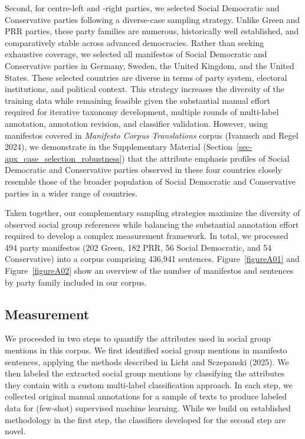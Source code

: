 \documentclass[12pt]{article}
\begin{document}
Second, for centre-left and -right parties, we selected Social Democratic and Conservative parties following a diverse-case sampling strategy.
Unlike Green and PRR parties, these party families are numerous, historically well established, and comparatively stable across advanced democracies.
Rather than seeking exhaustive coverage, we selected all manifestos of Social Democratic and Conservative parties in Germany, Sweden, the United Kingdom, and the United States.
These selected countries are diverse in terms of party system, electoral institutions, and political context.
This strategy increases the diversity of the training data while remaining feasible given the substantial manual effort required for iterative taxonomy development, multiple rounds of multi-label annotation, annotation revision, and classifier validation.
However, using manifestos covered in \emph{Manifesto Corpus Translations} corpus (Ivanusch and Regel 2024), we demonstrate in the Supplementary Material (Section~\ref{sec-apx_case_selection_robustness}) that the attribute emphasis profiles of Social Democratic and Conservative parties observed in these four countries closely resemble those of the broader population of Social Democratic and Conservative parties in a wider range of countries.

Taken together, our complementary sampling strategies maximize the diversity of observed social group references while balancing the substantial annotation effort required to develop a complex measurement framework.
In total, we processed 494 party manifestos (202 Green, 182 PRR, 56 Social Democratic, and 54 Conservative) into a corpus comprising 436,941 sentences.
Figure~\ref{figureA01} and Figure~\ref{figureA02} show an overview of the number of manifestos and sentences by party family included in our corpus.

\subsection{Measurement}\label{measurement}

We proceeded in two steps to quantify the attributes used in social group mentions in this corpus.
We first identified social group mentions in manifesto sentences, applying the methods described in Licht and Sczepanski (2025).
We then labeled the extracted social group mentions by classifying the attributes they contain with a custom multi-label classification approach.
In each step, we collected original manual annotations for a sample of texts to produce labeled data for (few-shot) supervised machine learning.
While we build on established methodology in the first step, the classifiers developed for the second step are novel.
\end{document}

